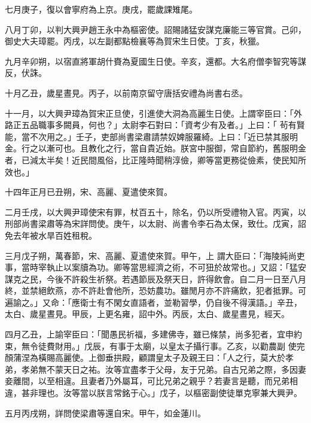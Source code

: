 \begin{pinyinscope}
 七月庚子，復以會寧府為上京。庚戌，罷歲課雉尾。



 八月丁卯，以判大興尹趙王永中為樞密使。詔賜諸猛安謀克廉能三等官賞。己卯，御史大夫璋罷。丙戌，以左副都點檢襄等為賀宋生日使。丁亥，秋獵。



 九月辛卯朔，以宿直將軍胡什賚為夏國生日使。辛亥，還都。大名府僧李智究等謀反，伏誅。



 十月乙丑，歲星晝見。丙子，以前南京留守唐括安禮為尚書右丞。



 十一月，以大興尹璋為賀宋正旦使，引進使大洞為高麗生日使。上謂宰臣曰：「外路正五品職事多闕員，何也？」太尉李石對曰：「資考少有及者。」上曰：「
 茍有賢能，當不次用之。」壬子，吏部尚書梁肅請禁奴婢服羅綺。上曰：「近已禁其服明金。行之以漸可也。且教化之行，當自貴近始。朕宮中服御，常自節約，舊服明金者，已減太半矣！近民間風俗，比正隆時聞稍淳儉，卿等當更務從儉素，使民知所效也。」



 十四年正月已丑朔，宋、高麗、夏遣使來賀。



 二月壬戌，以大興尹璋使宋有罪，杖百五十，除名，仍以所受禮物入官。丙寅，以刑部尚書梁肅等為宋詳問使。庚午，以太尉、尚書令李石為太保，致仕。戊寅，詔免去年被水旱百姓租稅。



 三月戊子朔，萬春節，宋、高麗、夏遣使來賀。甲午，上
 謂大臣曰：「海陵純尚吏事，當時宰執止以案牘為功。卿等當思經濟之術，不可狃於故常也。」又詔：「猛安謀克之民，今後不許殺生祈祭。若遇節辰及祭天日，許得飲會。自二月一日至八月終，並禁絕飲燕，亦不許赴會他所，恐妨農功。雖閒月亦不許痛飲，犯者抵罪。可遍諭之。」又命：「應衛士有不閑女直語者，並勒習學，仍自後不得漢語。」辛丑，太白、歲星晝見。甲辰，上更名雍，詔中外。丙辰，太白、歲星晝見，經天。



 四月乙丑，上諭宰臣曰：「聞愚民祈福，多建佛寺，雖已條禁，尚多犯者，宜申約束，無令徒費財用。」戊辰，有事于太廟，以皇太子攝行事。乙亥，以勸農副
 使完顏蒲涅為橫賜高麗使。上御垂拱殿，顧謂皇太子及親王曰：「人之行，莫大於孝弟，孝弟無不蒙天日之祐。汝等宜盡孝于父母，友于兄弟。自古兄弟之際，多因妻妾離間，以至相違。且妻者乃外屬耳，可比兄弟之親乎？若妻言是聽，而兄弟相違，甚非理也。汝等當以朕言常銘于心。」戊子，以樞密副使徒單克寧兼大興尹。



 五月丙戌朔，詳問使梁肅等還自宋。甲午，如金蓮川。




\end{pinyinscope}
